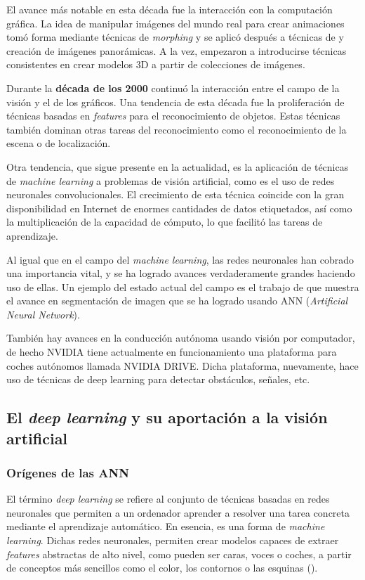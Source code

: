 El avance más notable en esta década fue la interacción con la computación gráfica. La idea de manipular imágenes del mundo real para crear animaciones tomó forma mediante técnicas de \textit{morphing} y se aplicó después a técnicas de
y creación de imágenes panorámicas. A la vez, empezaron a introducirse técnicas consistentes en crear modelos 3D a partir de colecciones de imágenes.

Durante la \textbf{década de los 2000} continuó la interacción entre el campo de la visión y el de los gráficos. Una tendencia de esta década fue la proliferación de técnicas basadas en \textit{features} para el reconocimiento de objetos. Estas técnicas también dominan otras tareas del reconocimiento como el reconocimiento de la escena o de localización.

Otra tendencia, que sigue presente en la actualidad, es la aplicación de técnicas de \textit{machine learning} a problemas de visión artificial, como es el uso de redes neuronales convolucionales. El crecimiento de esta técnica coincide con la gran disponibilidad en Internet de enormes cantidades de datos etiquetados, así como la multiplicación de la capacidad de cómputo, lo que facilitó las tareas de aprendizaje.

Al igual que en el campo del \textit{machine learning}, las redes neuronales han cobrado una importancia vital, y se ha logrado avances verdaderamente grandes haciendo uso de ellas. Un ejemplo del estado actual del campo es el trabajo de \citet{art:2017arXiv170306870H} que muestra el avance en segmentación de imagen que se ha logrado usando ANN (\textit{Artificial Neural Network}).

También hay avances en la conducción autónoma usando visión por computador, de hecho NVIDIA tiene actualmente en funcionamiento una plataforma para coches autónomos llamada NVIDIA DRIVE. Dicha plataforma, nuevamente, hace uso de técnicas de deep learning para detectar obstáculos, señales, etc.

\subsection{El \textit{deep learning} y su aportación a la visión artificial}
\subsubsection*{Orígenes de las ANN}

El término \textit{deep learning} se refiere al conjunto de técnicas basadas en redes neuronales que permiten a un ordenador aprender a resolver una tarea concreta mediante el aprendizaje automático. En esencia, es una forma de \textit{machine learning}. Dichas redes neuronales, permiten crear modelos capaces de extraer \textit{features} abstractas de alto nivel, como pueden ser caras, voces o coches, a partir de conceptos más sencillos como el color, los contornos o las esquinas (\citet{book:Goodfellow-et-al-2016}).

